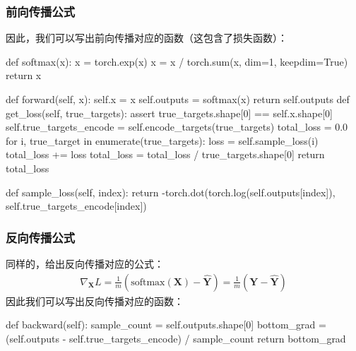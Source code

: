 \documentclass[12pt,a4paper]{ctexart}
\numberwithin{equation}{section}%
\numberwithin{figure}{section}%
\begin{document}
\subsubsection{前向传播公式}
因此，我们可以写出前向传播对应的函数（这包含了损失函数）：
\begin{python}
def softmax(x):
    x = torch.exp(x)
    x = x / torch.sum(x, dim=1, keepdim=True)
    return x

def forward(self, x):
    self.x = x
    self.outputs = softmax(x)
    return self.outputs
    def get_loss(self, true_targets):
        assert true_targets.shape[0] == self.x.shape[0]
        self.true_targets_encode = self.encode_targets(true_targets)
        total_loss = 0.0
        for i, true_target in enumerate(true_targets):
            loss = self.sample_loss(i)
            total_loss += loss
        total_loss = total_loss / true_targets.shape[0]
        return total_loss

def sample_loss(self, index):
    return -torch.dot(torch.log(self.outputs[index]), self.true_targets_encode[index])
\end{python}
\subsubsection{反向传播公式}
同样的，给出反向传播对应的公式：
\begin{align}
\nabla_{\boldsymbol{X}} L 
= \frac{1}{m} (\mathrm{softmax}(\boldsymbol{X})-\boldsymbol{\hat{Y}})
= \frac{1}{m} (\boldsymbol{Y-\hat{Y}})
\end{align}
因此我们可以写出反向传播对应的函数：
\begin{python}
def backward(self):
    sample_count = self.outputs.shape[0]
    bottom_grad = (self.outputs - self.true_targets_encode) / sample_count
    return bottom_grad
\end{python}
\end{document}
